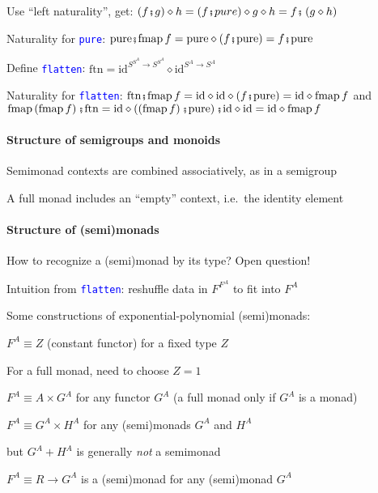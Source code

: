 Use ``left naturality'', get: $\left(f\bef g\right)\diamond h=\left(f\bef pure\right)\diamond g\diamond h=f\bef\left(g\diamond h\right)$

Naturality for \texttt{\textcolor{blue}{\footnotesize{}pure}}: $\text{pure}\bef\text{fmap}\,f=\text{pure}\diamond\left(f\bef\text{pure}\right)=f\bef\text{pure}$

Define \texttt{\textcolor{blue}{\footnotesize{}flatten}}: $\text{ftn}=\text{id}^{S^{S^{A}}\rightarrow S^{S^{A}}}\diamond\text{id}^{S^{A}\rightarrow S^{A}}$

Naturality for \texttt{\textcolor{blue}{\footnotesize{}flatten}}:
$\text{ftn}\bef\text{fmap}\,f=\text{id}\diamond\text{id}\diamond\left(f\bef\text{pure}\right)=\text{id}\diamond\text{fmap}\,f$
and $\text{fmap}\left(\text{fmap}\,f\right)\bef\text{ftn}=\text{id}\diamond\left(\left(\text{fmap}\,f\right)\bef\text{pure}\right)\bef\text{id}\diamond\text{id}=\text{id}\diamond\text{fmap}\,f$


\paragraph{Structure of semigroups and monoids}

Semimonad contexts are combined associatively, as in a semigroup

A full monad includes an ``empty'' context, i.e.\ the identity
element 

\paragraph{Structure of (semi)monads}

How to recognize a (semi)monad by its type? Open question!

Intuition from \texttt{\textcolor{blue}{\footnotesize{}flatten}}:
reshuffle data in $F^{F^{A}}$ to fit into $F^{A}$

Some constructions of exponential-polynomial (semi)monads:

$F^{A}\equiv Z$ (constant functor) for a fixed type $Z$

For a full monad, need to choose $Z=1$ 

$F^{A}\equiv A\times G^{A}$ for any functor $G^{A}$ (a full monad
only if $G^{A}$ is a monad)

$F^{A}\equiv G^{A}\times H^{A}$ for any (semi)monads $G^{A}$ and
$H^{A}$

but $G^{A}+H^{A}$ is generally \emph{not} a semimonad

$F^{A}\equiv R\rightarrow G^{A}$ is a (semi)monad for any (semi)monad
$G^{A}$


